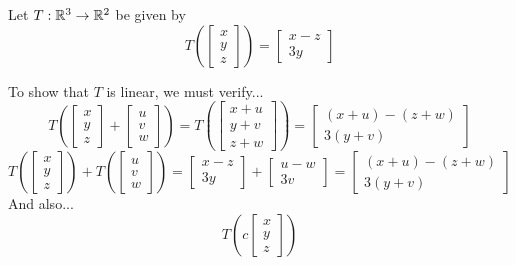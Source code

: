 \begin{example}
Let \(T : \mathbb{R}^3 \rightarrow \mathbb{R}^2\) be given by
\[
  T\left(\begin{bmatrix} x \\ y \\ z \end{bmatrix} \right)
=
  \begin{bmatrix} x-z \\ 3y \end{bmatrix}
\]

To show that \(T\) is linear, we must verify...
\[
  T\left(
    \begin{bmatrix} x \\ y \\ z \end{bmatrix} +
    \begin{bmatrix} u \\ v \\ w \end{bmatrix}
  \right)
=
  T\left(
    \begin{bmatrix} x+u \\ y+v \\ z+w \end{bmatrix}
  \right) =
  \begin{bmatrix} (x+u)-(z+w) \\ 3(y+v) \end{bmatrix}
\]
\[
  T\left(
    \begin{bmatrix} x \\ y \\ z \end{bmatrix}
  \right) + T\left(
    \begin{bmatrix} u \\ v \\ w \end{bmatrix}
  \right)
=
  \begin{bmatrix} x-z \\ 3y \end{bmatrix} +
  \begin{bmatrix} u-w \\ 3v \end{bmatrix}=
  \begin{bmatrix} (x+u)-(z+w) \\ 3(y+v) \end{bmatrix}
\]
And also...
\[
  T\left(c\begin{bmatrix} x \\ y \\ z \end{bmatrix} \right)
\]
\end{example}
